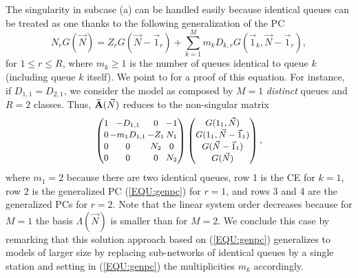 \documentclass[journal,twocolumn,9.5pt]{IEEEtran}
\newcommand{\comom}[1]{\bar{#1}}
\begin{document}
The singularity in subcase (a) can be handled easily because identical queues can be treated as one thanks to the following generalization of the PC \cite{Cas06b}
 \begin{equation}
 \label{EQU:genpc}
 \textstyle N_rG(\vec N)=Z_rG(\vec N-\vec 1_r)+\sum_{k=1}^M m_k D_{k,r}G(\vec 1_k,\vec N-\vec 1_r),
 \end{equation}
 for $1\leq r\leq R$, where $m_k\geq 1$ is the number of queues identical to queue $k$ (including queue $k$ itself). We point to \cite{Cas06b} for a proof of this equation. For instance, if $D_{1,1}=D_{2,1}$, we consider the model as composed by $M=1$ \emph{distinct} queues and $R=2$ classes. Thus, ${\bf \comom{A}}(\vec N)$ reduces to the non-singular matrix
\[
\renewcommand{\arraystretch}{1.1}
\arraycolsep 0.08em
\footnotesize
\begin{pmatrix}
   1& -D_{1,1}&   0&  -1\\
   0& -m_1 D_{1,1}& -Z_1&  N_1\\
   0&   0&  N_2&   0\\
   0&   0&   0&  N_2\\
\end{pmatrix}
\begin{pmatrix}
\small
\renewcommand{\arraystretch}{1.1}
\arraycolsep 0.1em
G(1_1,\vec N)\\
G(1_1,\vec N-\vec 1_1)\\
G(\vec N-\vec 1_1)\\
G(\vec N)\\
\end{pmatrix},
\]
where $m_1=2$ because there are two identical queues, row 1 is the CE for $k=1$, row 2 is the generalized PC (\ref{EQU:genpc}) for $r=1$, and rows 3 and 4 are the generalized PCs for $r=2$. Note that the linear system order decreases because for $M=1$ the basis $\Lambda(\vec N)$ is smaller than for $M=2$. We conclude this case by remarking that this solution approach based on (\ref{EQU:genpc}) generalizes to models of larger size by replacing sub-networks of identical queues by a single station and setting in (\ref{EQU:genpc}) the multiplicities $m_k$ accordingly.
\end{document}
